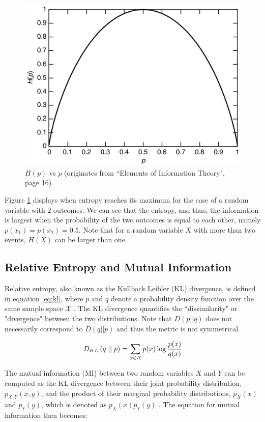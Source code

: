 \begin{figure}[h]
	\centering
	\includegraphics[width=0.4\linewidth]{screenshot005}
	\caption{$H(p)$ vs $p$ (originates from ``Elements of Information Theory", page 16)}
	\label{fig:EntropyvsP}
\end{figure}



Figure \ref{fig:EntropyvsP} displays when entropy reaches its maximum for the case of a random variable with 2 outcomes. We can see that the entropy, and thus, the information is largest when the probability of the two outcomes is equal to each other, namely $p(x_1)=p(x_2)=0.5$. Note that for a random variable $X$ with more than two events, $H(X)$ can be larger than one.

\subsection{Relative Entropy and Mutual Information} \label{cha:rel_entrop}
Relative entropy, also known as the Kullback Leibler (KL) divergence, is defined in equation \ref{eq:kl}, where $p$ and $q$ denote a probability density function over the same sample space $\mathcal{X}$ \citep{coverElementsInformationTheory2006}. The KL divergence quantifies the ``dissimilarity" or "divergence" between the two distributions. Note that $D(p||q)$ does not necessarily correspond to $D(q||p)$ and thus the metric is not symmetrical.

\begin{equation}
	D_{KL} \left( q \mid \mid p \right) = \sum_{x\in\mathcal{X}}p(x) \log \frac{p(x)}{q(x)} \label{eq:kl}
\end{equation}



The mutual information (MI) between two random variables $X$ and $Y$ can be computed as the KL divergence between their joint probability distribution, $p_{X,Y}(x,y)$, and the product of their marginal probability distributions, $p_X(x)$ and $p_Y(y)$, which is denoted as $p_X(x)p_Y(y)$ \citep{coverElementsInformationTheory2006}. The equation for mutual information then becomes:

